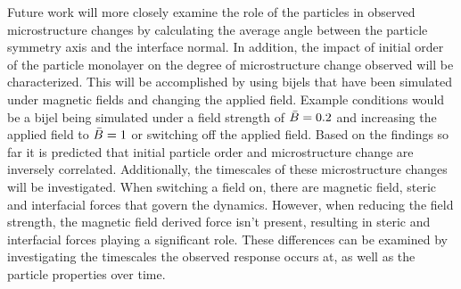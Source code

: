 Future work will more closely examine the role of the particles in observed microstructure changes by calculating the average angle between the particle symmetry axis and the interface normal. In addition, the impact of initial order of the particle monolayer on the degree of microstructure change observed will be characterized. This will be accomplished by using bijels that have been simulated under magnetic fields and changing the applied field. Example conditions would be a bijel being simulated under a field strength of $\Bar{B} = 0.2$ and increasing the applied field to $\Bar{B} = 1$ or switching off the applied field. Based on the findings so far it is predicted that initial particle order and microstructure change are inversely correlated. Additionally, the timescales of these microstructure changes will be investigated. When switching a field on, there are magnetic field, steric and interfacial forces that govern the dynamics. However, when reducing the field strength, the magnetic field derived force isn't present, resulting in steric and interfacial forces playing a significant role. These differences can be examined by investigating the timescales the observed response occurs at, as well as the particle properties over time.

